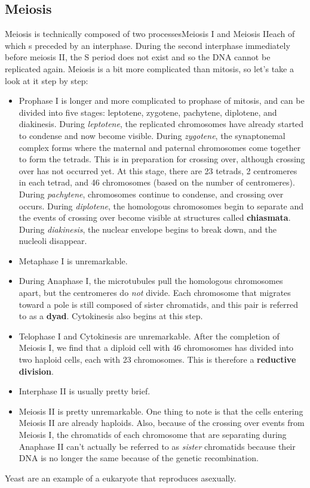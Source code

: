 \documentclass{article}
\theoremstyle{plain}%
\theoremstyle{definition}
\theoremstyle{remark}
\begin{document}
\subsection{Meiosis}
Meiosis is technically composed of two processes\textemdash Meiosis I and Meiosis II\textemdash each of which s preceded by an interphase. During the second interphase immediately before meiosis II, the S period does not exist and so the DNA cannot be replicated again. Meiosis is a bit more complicated than mitosis, so let's take a look at it step by step:
\begin{itemize}
	\item Prophase I is longer and more complicated to prophase of mitosis, and can be divided into five stages: leptotene, zygotene, pachytene, diplotene, and diakinesis. During \textit{leptotene}, the replicated chromosomes have already started to condense and now become visible. During \textit{zygotene}, the synaptonemal complex forms where the maternal and paternal chromosomes come together to form the tetrads. This is in preparation for crossing over, although crossing over has not occurred yet. At this stage, there are 23 tetrads, 2 centromeres in each tetrad, and 46 chromosomes (based on the number of centromeres). During \textit{pachytene}, chromosomes continue to condense, and crossing over occurs. During \textit{diplotene}, the homologous chromosomes begin to separate and the events of crossing over become visible at structures called \textbf{chiasmata}. During \textit{diakinesis}, the nuclear envelope begins to break down, and the nucleoli disappear. 
	\item Metaphase I is unremarkable.
	\item During Anaphase I, the microtubules pull the homologous chromosomes apart, but the centromeres do \textit{not} divide. Each chromosome that migrates toward a pole is still composed of sister chromatids, and this pair is referred to as a \textbf{dyad}. Cytokinesis also begins at this step.
	\item Telophase I and Cytokinesis are unremarkable. After the completion of Meiosis I, we find that a diploid cell with 46 chromosomes has divided into two haploid cells, each with 23 chromosomes. This is therefore a \textbf{reductive division}.
	\item Interphase II is usually pretty brief.
	\item Meiosis II is pretty unremarkable. One thing to note is that the cells entering Meiosis II are already haploids. Also, because of the crossing over events from Meiosis I, the chromatids of each chromosome that are separating during Anaphase II can't actually be referred to as \textit{sister} chromatids because their DNA is no longer the same because of the genetic recombination.
\end{itemize}
\noindent Yeast are an example of a eukaryote that reproduces asexually.
\end{document}

